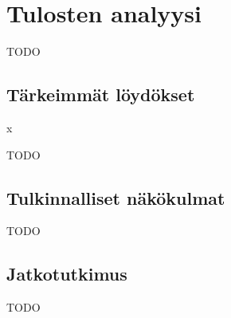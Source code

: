 \vspace{21.5pt}
\chapter{Tulosten analyysi}
TODO

\section{Tärkeimmät löydökset}x

TODO

\section{Tulkinnalliset näkökulmat}

TODO

\section{Jatkotutkimus}

TODO